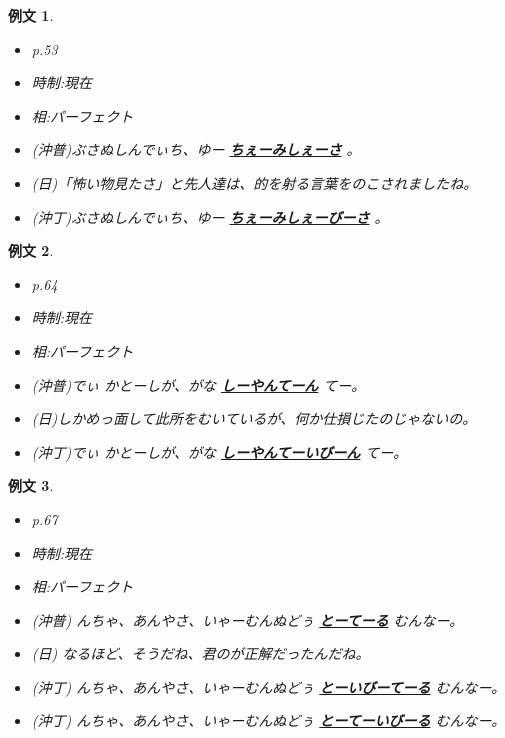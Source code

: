 \documentclass[a4j,12pt]{jarticle}
\theoremstyle{break}
\newtheorem{example}{例文}
\newcommand{\highlight}[1]{
  \textbf{\underline{#1}}
}
\begin{document}
\begin{example}
  \begin{itemize}
  \item p.53
  \item 時制:現在
  \item 相:パーフェクト
  \item (沖普)ぶさぬしんでぃち、ゆー\highlight{ちぇーみしぇーさ}。
  \item (日)「怖い物見たさ」と先人達は、的を射る言葉をのこされましたね。
  \item (沖丁)ぶさぬしんでぃち、ゆー\highlight{ちぇーみしぇーびーさ}。
  \end{itemize}
\end{example}
\begin{example}
  \begin{itemize}
  \item p.64
  \item 時制:現在
  \item 相:パーフェクト
  \item (沖普)でぃ かとーしが、がな \highlight{しーやんてーん}てー。
  \item (日)しかめっ面して此所をむいているが、何か仕損じたのじゃないの。
  \item (沖丁)でぃ かとーしが、がな \highlight{しーやんてーいびーん}てー。
  \end{itemize}
\end{example}
\begin{example}
  \begin{itemize}
  \item p.67
  \item 時制:現在
  \item 相:パーフェクト
  \item (沖普) んちゃ、あんやさ、いゃーむんぬどぅ\highlight{とーてーる}むんなー。
  \item (日) なるほど、そうだね、君のが正解だったんだね。
  \item (沖丁)  んちゃ、あんやさ、いゃーむんぬどぅ\highlight{とーいびーてーる}むんなー。
  \item (沖丁)  んちゃ、あんやさ、いゃーむんぬどぅ\highlight{とーてーいびーる}むんなー。
  \end{itemize}
\end{example}
\end{document}
